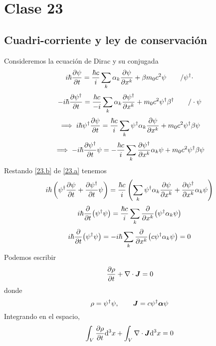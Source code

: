 \section{Clase 23}
\subsection{Cuadri-corriente y ley de conservación}
Consideremos la ecuación de Dirac y su conjugada
\begin{equation}
  i\hbar\pdv{\psi}{t}=\frac{\hbar c}{i}\sum_k\alpha_k\pdv{\psi}{x^k }+\beta m_0c^2\psi\qquad /\psi^\dagger\cdot
\end{equation}
\begin{equation}
  -i\hbar\pdv{\psi^\dagger}{t}=\frac{\hbar c}{-i}\sum_k\alpha_k\pdv{\psi^\dagger}{x^k }+m_0c^2\psi^\dagger\beta^\dagger\qquad /\cdot\psi
\end{equation}
\begin{equation}\label{23.a}
  \implies i\hbar\psi^\dagger \pdv{\psi}{t}=\frac{\hbar c}{i}\sum_k\psi^\dagger \alpha_k\pdv{\psi}{x^k }+m_0c^2\psi^\dagger \beta\psi
\end{equation}
\begin{equation}\label{23.b}
  \implies -i\hbar\pdv{\psi^\dagger}{t}\psi=-\frac{\hbar c}{i}\sum_k\pdv{\psi^\dagger}{x^k }\alpha_k\psi+m_0c^2\psi^\dagger \beta\psi
\end{equation}
Restando \eqref{23.b} de \eqref{23.a} tenemos
\begin{equation}
  i\hbar\left(\psi^\dagger\pdv{\psi}{t}+\pdv{\psi^\dagger}{t}\psi\right)=\frac{\hbar c}{i}\left(\sum_k\psi^\dagger \alpha_k\pdv{\psi}{x^k}+\pdv{\psi^\dagger}{x^k}\alpha_k\psi\right)
\end{equation}
\begin{equation}
  i\hbar\pdv{t}(\psi^\dagger\psi)=\frac{\hbar c}{i}\sum_k\pdv{x^k}(\psi^\dagger\alpha_k\psi)
\end{equation}
\begin{equation}
   i\hbar\pdv{t}(\psi^\dagger\psi)=-i\hbar\sum_k\pdv{x^k}(c\psi^\dagger\alpha_k\psi)=0
\end{equation}
Podemos escribir
\begin{equation}
  \pdv{\rho}{t}+\nabla\cdot\vb*{J}=0
\end{equation}
donde
\begin{equation}
  \rho=\psi^\dagger\psi,\qquad \vb*{J}=c\psi^\dagger\vb*{\alpha }\psi
\end{equation}
Integrando en el espacio,
\begin{equation}
  \int_V\pdv{\rho}{t}\dd^3x+\int_V\nabla\cdot\vb*{J}\dd^3x=0
\end{equation}
